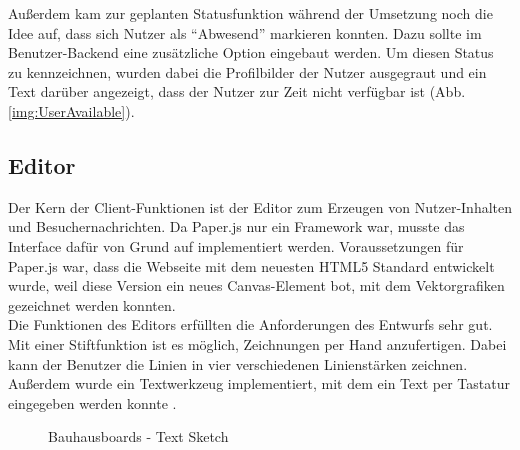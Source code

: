 Außerdem kam zur geplanten Statusfunktion während der Umsetzung noch die Idee auf, dass sich Nutzer als ``Abwesend'' markieren konnten. Dazu sollte im Benutzer-Backend eine zusätzliche Option eingebaut werden. Um diesen Status zu kennzeichnen, wurden dabei die Profilbilder der Nutzer ausgegraut und ein Text darüber angezeigt, dass der Nutzer zur Zeit nicht verfügbar ist (Abb. \ref{img:UserAvailable}).



\subsection{Editor}\label{Editor}
Der Kern der Client-Funktionen ist der Editor zum Erzeugen von Nutzer-Inhalten und Besuchernachrichten. Da Paper.js nur ein Framework war, musste das Interface dafür von Grund auf implementiert werden.
Voraussetzungen für Paper.js war, dass die Webseite mit dem neuesten HTML5 Standard entwickelt wurde, weil diese Version ein neues Canvas-Element bot, mit dem Vektorgrafiken gezeichnet werden konnten.
\\
Die Funktionen des Editors erfüllten die Anforderungen des Entwurfs sehr gut.
Mit einer Stiftfunktion ist es möglich, Zeichnungen per Hand anzufertigen. Dabei kann der Benutzer die Linien in vier verschiedenen Linienstärken zeichnen.
\\
Außerdem wurde ein Textwerkzeug implementiert, mit dem ein Text per Tastatur eingegeben werden konnte .
\begin{figure}[h!]
  \centering
  \caption{Bauhausboards - Text Sketch}
  \label{img:editorTextSketch}
\end{figure}
